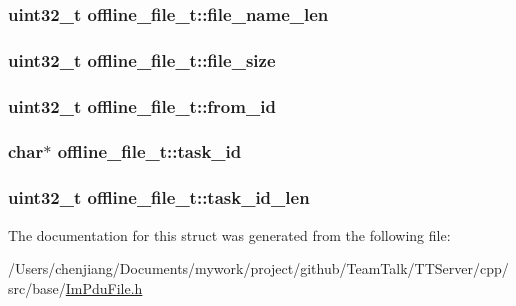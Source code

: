 \subsubsection[{file\+\_\+name\+\_\+len}]{\setlength{\rightskip}{0pt plus 5cm}uint32\+\_\+t offline\+\_\+file\+\_\+t\+::file\+\_\+name\+\_\+len}\label{structoffline__file__t_ae3360aff1f4fe416624071387af26bd9}
\hypertarget{structoffline__file__t_a214840ace918aea92989afeb7e02c8fe}{}
\subsubsection[{file\+\_\+size}]{\setlength{\rightskip}{0pt plus 5cm}uint32\+\_\+t offline\+\_\+file\+\_\+t\+::file\+\_\+size}\label{structoffline__file__t_a214840ace918aea92989afeb7e02c8fe}
\hypertarget{structoffline__file__t_acdaf66c95fe804d347040f24b429540c}{}
\subsubsection[{from\+\_\+id}]{\setlength{\rightskip}{0pt plus 5cm}uint32\+\_\+t offline\+\_\+file\+\_\+t\+::from\+\_\+id}\label{structoffline__file__t_acdaf66c95fe804d347040f24b429540c}
\hypertarget{structoffline__file__t_ad0d8722adc120b2d424535bd37106f15}{}
\subsubsection[{task\+\_\+id}]{\setlength{\rightskip}{0pt plus 5cm}char$\ast$ offline\+\_\+file\+\_\+t\+::task\+\_\+id}\label{structoffline__file__t_ad0d8722adc120b2d424535bd37106f15}
\hypertarget{structoffline__file__t_aca2c92fcea23fc59df7dd19d2c6d9d23}{}
\subsubsection[{task\+\_\+id\+\_\+len}]{\setlength{\rightskip}{0pt plus 5cm}uint32\+\_\+t offline\+\_\+file\+\_\+t\+::task\+\_\+id\+\_\+len}\label{structoffline__file__t_aca2c92fcea23fc59df7dd19d2c6d9d23}


The documentation for this struct was generated from the following file\+:\begin{DoxyCompactItemize}
\item 
/\+Users/chenjiang/\+Documents/mywork/project/github/\+Team\+Talk/\+T\+T\+Server/cpp/src/base/\hyperlink{_im_pdu_file_8h}{Im\+Pdu\+File.\+h}\end{DoxyCompactItemize}
